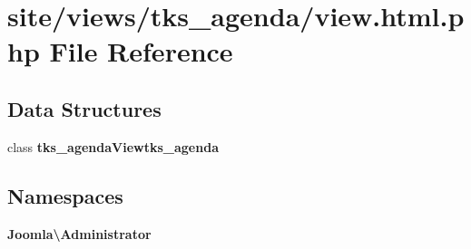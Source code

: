 \section{site/views/tks\+\_\+agenda/view.html.\+php File Reference}
\label{site_2views_2tks__agenda_2view_8html_8php}
\subsection*{Data Structures}
\begin{DoxyCompactItemize}
\item 
class \textbf{ tks\+\_\+agenda\+Viewtks\+\_\+agenda}
\end{DoxyCompactItemize}
\subsection*{Namespaces}
\begin{DoxyCompactItemize}
\item 
 \textbf{ Joomla\textbackslash{}\+Administrator}
\end{DoxyCompactItemize}
